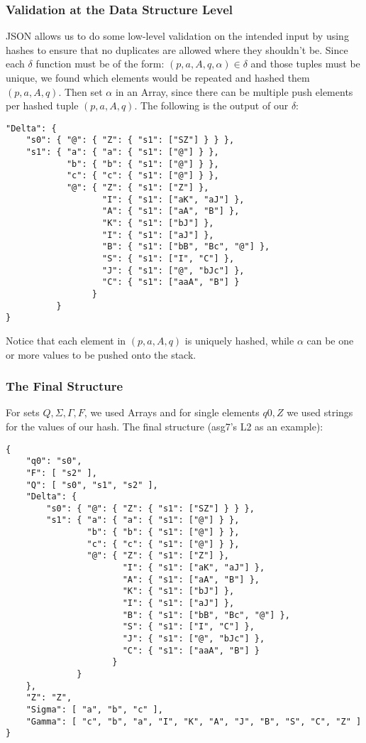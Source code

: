 \documentclass[a4paper]{report}
\begin{document}
\subsubsection*{Validation at the Data Structure Level}
JSON allows us to do some low-level validation on the intended input by using
hashes to ensure that no duplicates are allowed where they shouldn't be. Since
each $\delta$ function must be of the form: $(p,a,A,q,\alpha)\in\delta$ and
those tuples must be unique, we found which elements would be repeated and
hashed them $(p, a, A, q)$. Then set $\alpha$ in an Array, since there can be
multiple push elements per hashed tuple $(p,a,A,q)$. The following is the output
of our $\delta$:
\begin{verbatim}
"Delta": {
    "s0": { "@": { "Z": { "s1": ["SZ"] } } },
    "s1": { "a": { "a": { "s1": ["@"] } },
            "b": { "b": { "s1": ["@"] } },
            "c": { "c": { "s1": ["@"] } },
            "@": { "Z": { "s1": ["Z"] },
                   "I": { "s1": ["aK", "aJ"] },
                   "A": { "s1": ["aA", "B"] },
                   "K": { "s1": ["bJ"] },
                   "I": { "s1": ["aJ"] },
                   "B": { "s1": ["bB", "Bc", "@"] },
                   "S": { "s1": ["I", "C"] },
                   "J": { "s1": ["@", "bJc"] },
                   "C": { "s1": ["aaA", "B"] }
                 }
          }
}
\end{verbatim}
Notice that each element in $(p,a,A,q)$ is uniquely hashed, while $\alpha$ can
be one or more values to be pushed onto the stack.
\subsubsection*{The Final Structure}
For sets $Q, \Sigma, \Gamma, F$, we used Arrays and for single elements $q0, Z$
we used strings for the values of our hash. The final structure (asg7's L2 as an
example):
\begin{verbatim}
{
    "q0": "s0",
    "F": [ "s2" ],
    "Q": [ "s0", "s1", "s2" ],
    "Delta": {
        "s0": { "@": { "Z": { "s1": ["SZ"] } } },
        "s1": { "a": { "a": { "s1": ["@"] } },
                "b": { "b": { "s1": ["@"] } },
                "c": { "c": { "s1": ["@"] } },
                "@": { "Z": { "s1": ["Z"] },
                       "I": { "s1": ["aK", "aJ"] },
                       "A": { "s1": ["aA", "B"] },
                       "K": { "s1": ["bJ"] },
                       "I": { "s1": ["aJ"] },
                       "B": { "s1": ["bB", "Bc", "@"] },
                       "S": { "s1": ["I", "C"] },
                       "J": { "s1": ["@", "bJc"] },
                       "C": { "s1": ["aaA", "B"] }
                     }
              }
    },
    "Z": "Z",
    "Sigma": [ "a", "b", "c" ],
    "Gamma": [ "c", "b", "a", "I", "K", "A", "J", "B", "S", "C", "Z" ]
}
\end{verbatim}
\end{document}
